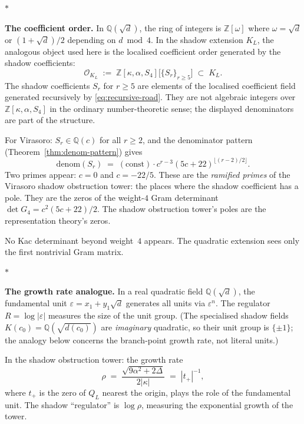 \documentclass[11pt]{article}
\newcommand{\cO}{\mathcal{O}}
\newcommand{\Z}{\mathbb{Z}}
\newcommand{\Q}{\mathbb{Q}}
\newcommand{\sep}{\bigskip\begin{center}$*$\end{center}\medskip}
\begin{document}
\sep

\noindent\textbf{The coefficient order.}\enspace
In $\Q(\sqrt{d})$, the ring of integers is $\Z[\omega]$ where
$\omega = \sqrt{d}$ or $(1+\sqrt{d})/2$ depending on
$d \bmod 4$.  In the shadow extension $K_L$, the analogous
object used here is the localised coefficient order generated by
the shadow coefficients:
\begin{equation}\label{eq:shadow-integers}
  \cO_{K_L}
  \;:=\;
  \Z[\kappa, \alpha, S_4]\bigl[\bigl\{S_r\bigr\}_{r \geq 5}\bigr]
  \;\subset\; K_L.
\end{equation}
The shadow coefficients $S_r$ for $r \geq 5$ are elements of the
localised coefficient field generated recursively by
\eqref{eq:recursive-road}.  They are not algebraic integers over
$\Z[\kappa,\alpha,S_4]$ in the ordinary number-theoretic sense;
the displayed denominators are part of the structure.

For Virasoro: $S_r \in \Q(c)$ for all $r \geq 2$, and the
denominator pattern (Theorem~\ref{thm:denom-pattern}) gives
\[
  \mathrm{denom}(S_r)
  \;=\;
  (\mathrm{const})\cdot
  c^{r-3}(5c{+}22)^{\lfloor(r-2)/2\rfloor}.
\]
Two primes appear: $c = 0$ and $c = -22/5$.  These are the
\emph{ramified primes} of the Virasoro shadow obstruction tower: the
places where the shadow coefficient has a pole.  They are the
zeros of the weight-$4$ Gram determinant
$\det G_4 = c^2(5c{+}22)/2$.  The shadow obstruction tower's poles are
the representation theory's zeros.

No Kac determinant beyond weight~$4$ appears.  The quadratic
extension sees only the first nontrivial Gram matrix.

\sep

\noindent\textbf{The growth rate analogue.}\enspace
In a real quadratic field $\Q(\sqrt{d})$, the fundamental unit
$\varepsilon = x_1 + y_1\sqrt{d}$ generates all units via
$\varepsilon^n$.  The regulator $R = \log|\varepsilon|$ measures
the size of the unit group.  (The specialised shadow fields
$K(c_0) = \Q(\sqrt{d(c_0)})$ are \emph{imaginary} quadratic,
so their unit group is $\{\pm 1\}$; the analogy below
concerns the branch-point growth rate, not literal units.)

In the shadow obstruction tower: the growth rate
\begin{equation}\label{eq:growth-rate-unit}
  \rho
  \;=\;
  \frac{\sqrt{9\alpha^2 + 2\Delta}}{2|\kappa|}
  \;=\;
  |t_+|^{-1},
\end{equation}
where $t_+$ is the zero of $Q_L$ nearest the origin, plays
the role of the fundamental unit.  The shadow ``regulator''
is $\log\rho$, measuring the exponential growth of the tower.
\end{document}
